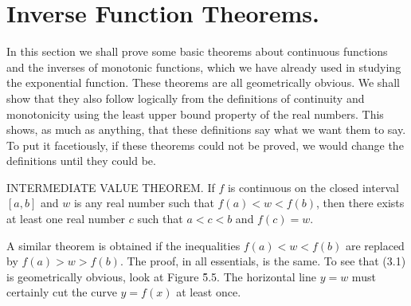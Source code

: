 \section{Inverse Function Theorems.}\label{sec 5.3}  
In this section we shall prove some basic theorems about
continuous functions and the inverses of monotonic functions, which we have already used in studying the exponential function. These theorems are all geometrically obvious. We shall show that they also follow
logically from the definitions of continuity and monotonicity using the least upper bound property of the real numbers. This shows, as much as anything, that these definitions say what we want them to say. To put it facetiously, if these theorems could not be proved, we would
change the definitions until they could be.


\begin{theorem} INTERMEDIATE VALUE THEOREM. %
If $f$ is continuous on the closed interval $[a, b]$ and $w$ is
any real number such that $f (a) < w < f (b)$, then there exists at least one real number $c$ such that $a < c < b$ and $f(c) = w$.
\end{theorem}

A similar theorem is obtained if the inequalities $f(a) < w < f(b)$ are replaced by $f(a) > w > f (b)$. The proof, in all essentials, is the same. To see that (3.1) is geometrically obvious, look at Figure \f{5.5}. The horizontal line $y = w$ must certainly cut the curve $y = f (x)$ at least once.


